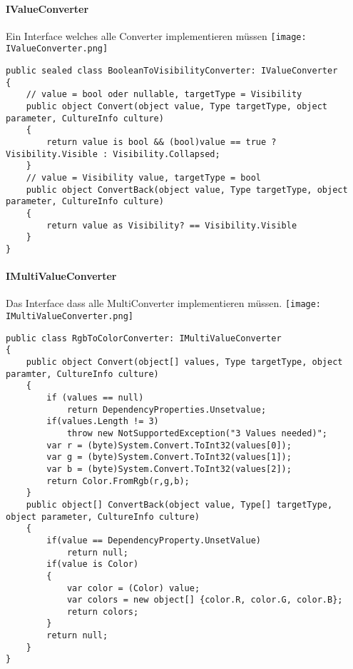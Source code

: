 \paragraph{IValueConverter} Ein Interface welches alle Converter implementieren müssen
\texttt{[image: IValueConverter.png]}
\begin{lstlisting}[caption="Konvertiert bool oder Nullable in Visibility und zurück"]
public sealed class BooleanToVisibilityConverter: IValueConverter
{
    // value = bool oder nullable, targetType = Visibility
    public object Convert(object value, Type targetType, object parameter, CultureInfo culture)
    {
        return value is bool && (bool)value == true ? Visibility.Visible : Visibility.Collapsed;
    }
    // value = Visibility value, targetType = bool
    public object ConvertBack(object value, Type targetType, object parameter, CultureInfo culture)
    {
        return value as Visibility? == Visibility.Visible
    }
}
\end{lstlisting}
\paragraph{IMultiValueConverter} Das Interface dass alle MultiConverter implementieren müssen.
\texttt{[image: IMultiValueConverter.png]}
\begin{lstlisting}
public class RgbToColorConverter: IMultiValueConverter
{
    public object Convert(object[] values, Type targetType, object paramter, CultureInfo culture)
    {
        if (values == null)
            return DependencyProperties.Unsetvalue;
        if(values.Length != 3)
            throw new NotSupportedException("3 Values needed)";
        var r = (byte)System.Convert.ToInt32(values[0]);
        var g = (byte)System.Convert.ToInt32(values[1]);
        var b = (byte)System.Convert.ToInt32(values[2]);
        return Color.FromRgb(r,g,b);
    }
    public object[] ConvertBack(object value, Type[] targetType, object parameter, CultureInfo culture)
    {
        if(value == DependencyProperty.UnsetValue)
            return null;
        if(value is Color)
        {
            var color = (Color) value;
            var colors = new object[] {color.R, color.G, color.B};
            return colors;
        }
        return null;
    }
}
\end{lstlisting}
